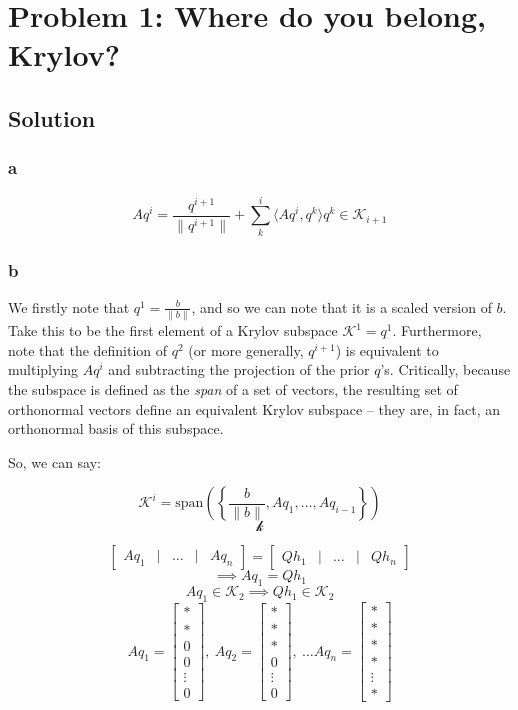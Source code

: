 \documentclass[11pt]{report}
\theoremstyle{definition}
\begin{document}
\section*{Problem 1: Where do you belong, Krylov?}
\subsection*{Solution}

\subsubsection*{a}

\[
	Aq^i = \frac{q^{i+1}}{\|q^{i+1}\|} + \sum_{k}^{i}\langle Aq^i,q^k\rangle q^k \in \mathcal{K}_{i+1}
\]

\subsubsection*{b}

We firstly note that $q^1=\frac{b}{\|b\|}$, and so we can note that it is a
scaled version of $b$. Take this to be the first element of a Krylov subspace
$\mathcal{K}^1=q^1$.  Furthermore, note that the definition of $q^2$ (or more
generally, $q^{i+1}$) is equivalent to multiplying $Aq^{i}$ and subtracting the projection
of the prior $q$'s. Critically, because the subspace is defined as the \textit{span} of a
set of vectors, the resulting set of orthonormal vectors define an equivalent
Krylov subspace -- they are, in fact, an orthonormal basis of this subspace.

So, we can say:

\[\mathcal{K}^i = \mathrm{span}(\left\{\frac{b}{\|b\|}, Aq_1,\ldots, Aq_{i-1}\right\})\]
\[\mathcal{k}\]


\[
	\begin{bmatrix}
		Aq_1 & | & \ldots & | & Aq_n
	\end{bmatrix}
	=
	\begin{bmatrix}
		Qh_1 & | & \ldots & | & Qh_n
	\end{bmatrix}
\]
\[\implies Aq_1=Qh_1\]
\[Aq_1\in\mathcal{K}_2\implies Qh_1\in\mathcal{K}_2\]
\[
	Aq_1 = \begin{bmatrix}
		* \\ * \\ 0 \\ 0 \\ \vdots \\ 0
	\end{bmatrix},\
	Aq_2 = \begin{bmatrix}
		* \\ * \\ * \\ 0 \\ \vdots \\ 0
	\end{bmatrix},\ \ldots
	Aq_n = \begin{bmatrix}
		* \\ * \\ * \\ * \\ \vdots \\ *
	\end{bmatrix}
\]
\end{document}
